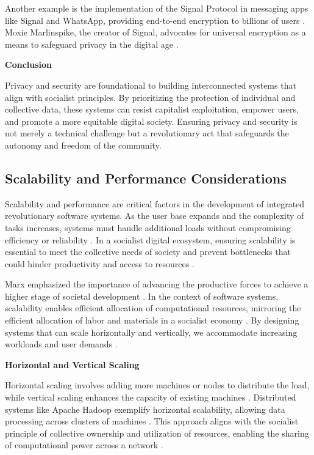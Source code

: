 \begin{refsection}
Another example is the implementation of the Signal Protocol in messaging apps like Signal and WhatsApp, providing end-to-end encryption to billions of users \cite[pp.~25-27]{Marlinspike2016}. Moxie Marlinspike, the creator of Signal, advocates for universal encryption as a means to safeguard privacy in the digital age \cite[pp.~5-7]{Marlinspike2016}.

\textbf{Conclusion}

Privacy and security are foundational to building interconnected systems that align with socialist principles. By prioritizing the protection of individual and collective data, these systems can resist capitalist exploitation, empower users, and promote a more equitable digital society. Ensuring privacy and security is not merely a technical challenge but a revolutionary act that safeguards the autonomy and freedom of the community.

\subsection{Scalability and Performance Considerations}

Scalability and performance are critical factors in the development of integrated revolutionary software systems. As the user base expands and the complexity of tasks increases, systems must handle additional loads without compromising efficiency or reliability \cite[pp.~45-47]{Hennessy2019}. In a socialist digital ecosystem, ensuring scalability is essential to meet the collective needs of society and prevent bottlenecks that could hinder productivity and access to resources \cite[pp.~85-87]{Marx1867}.

Marx emphasized the importance of advancing the productive forces to achieve a higher stage of societal development \cite[pp.~488-490]{Marx1867}. In the context of software systems, scalability enables efficient allocation of computational resources, mirroring the efficient allocation of labor and materials in a socialist economy \cite[pp.~172-173]{Marx1867}. By designing systems that can scale horizontally and vertically, we accommodate increasing workloads and user demands \cite[pp.~110-112]{Dean2013}.

\textbf{Horizontal and Vertical Scaling}

Horizontal scaling involves adding more machines or nodes to distribute the load, while vertical scaling enhances the capacity of existing machines \cite[pp.~33-35]{Hennessy2019}. Distributed systems like Apache Hadoop exemplify horizontal scalability, allowing data processing across clusters of machines \cite[pp.~25-27]{White2015}. This approach aligns with the socialist principle of collective ownership and utilization of resources, enabling the sharing of computational power across a network \cite[pp.~89-91]{Stallman2010}.


\end{refsection}

